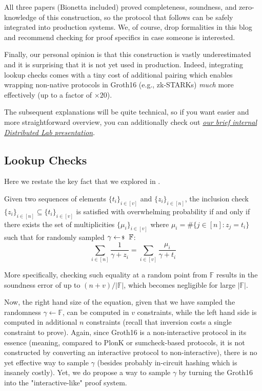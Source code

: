 All three papers (Bionetta included) proved completeness, soundness, and
zero-knowledge of this construction, so the protocol that follows can be safely
integrated into production systems. We, of course, drop formalities in this blog
and recommend checking \cite{mirageplus} for proof specifics in case someone is interested.

Finally, our personal opinion is that this construction is vastly underestimated
and it is surprising that it is not yet used in production. Indeed, integrating
lookup checks comes with a tiny cost of additional pairing which enables
wrapping non-native protocols in Groth16 (e.g., zk-STARKs) \textit{much} more
effectively (up to a factor of $\times 20$). 

\begin{remark}
The subsequent explanations will be quite technical, so if you want easier and
more straightforward overview, you can additionally check out
\href{https://github.com/ZamDimon/presentations-and-talks/blob/main/ultragroth/ultragroth-static.pdf}{\textit{our
brief internal Distributed Lab presentation}}.
\end{remark}

\subsection{Lookup Checks}

Here we restate the key fact that we explored in .

\begin{theorem} 
    Given two sequences of elements $\{t_i\}_{i \in [v]}$ and $\{z_i\}_{i \in
    [n]}$, the inclusion check $\{z_i\}_{i \in [n]} \subseteq \{t_i\}_{i \in
    [v]}$ is satisfied with overwhelming probability if and only if there exists
    the set of multiplicities $\{\mu_i\}_{i \in [v]}$ where $\mu_i = \#\{j \in
    [n]: z_j = t_i\}$ such that for randomly sampled $\gamma \leftarrowS
    \mathbb{F}$:
\[
    \sum_{i \in [n]} \frac{1}{\gamma+z_i} = \sum_{i \in [v]} \frac{\mu_i}{\gamma+t_i}
\]
\end{theorem}

More specifically, checking such equality at a random point from $\mathbb{F}$
results in the soundness error of up to $(n+v)/|\mathbb{F}|$, which becomes
negligible for large $|\mathbb{F}|$.

Now, the right hand size of the equation, given that we have sampled the
randomness $\gamma \gets \mathbb{F}$, can be computed in $v$ constraints, while
the left hand side is computed in additional $n$ constraints (recall that
inversion costs a single constraint to prove). Again, since Groth16 is a
non-interactive protocol in its essence (meaning, compared to PlonK or
sumcheck-based protocols, it is not constructed by converting an interactive
protocol to non-interactive), there is no yet effective way to sample $\gamma$
(besides probably in-circuit hashing which is insanely costly). Yet, we do
propose a way to sample $\gamma$ by turning the Groth16 into the
"interactive-like" proof system.

